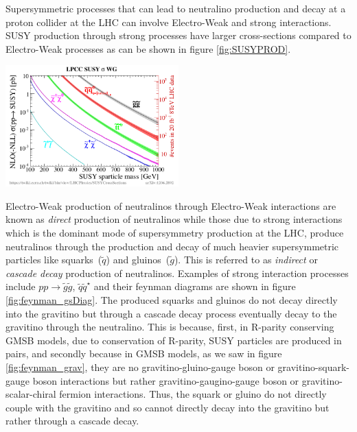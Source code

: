 {Supersymmetric processes that can lead to neutralino production and decay at a proton collider at the LHC can involve Electro-Weak and strong interactions. SUSY production through strong processes have larger cross-sections compared to Electro-Weak processes as can be shown in figure \ref{fig:SUSYPROD}. 

\begin{center}
\mbox{\includegraphics[height=0.5\textwidth,width=0.5\textwidth]{THESISPLOTS/SUSY_Xsec.png}}
\label{fig:SUSYPROD}
\end{center}


Electro-Weak production of neutralinos through Electro-Weak interactions are known as \textit{direct} production of neutralinos while those due to strong interactions which is the dominant mode of supersymmetry production at the LHC, produce neutralinos through the production and decay of much heavier supersymmetric particles like squarks~($\tilde{q}$) and gluinos~($\tilde{g}$). This is referred to as \textit{indirect} or \textit{cascade decay} production of neutralinos. Examples of strong interaction processes include $pp \rightarrow \tilde{g}\tilde{g}$, $\tilde{q}\tilde{q}^{\star}$ and their feynman diagrams are shown in figure \ref{fig:feynman_gsDiag}. The produced squarks and gluinos do not decay directly into the gravitino but through a cascade decay process eventually decay to the gravitino through the neutralino. This is because, first, in R-parity conserving GMSB models, due to conservation of R-parity, SUSY particles are produced in pairs, and secondly because in GMSB models, as we saw in figure \ref{fig:feynman_grav}, they are no gravitino-gluino-gauge boson or gravitino-squark-gauge boson interactions but rather gravitino-gaugino-gauge boson or gravitino-scalar-chiral fermion interactions. Thus, the squark or gluino do not directly couple with the gravitino and so cannot directly decay into the gravitino but rather through a cascade decay. 

}

